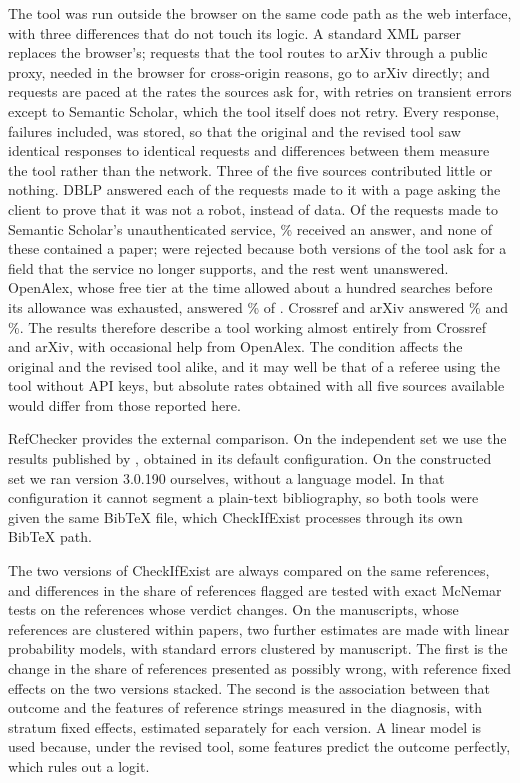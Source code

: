 \documentclass[pdflatex,sn-apa]{sn-jnl}
\begin{document}
The tool was run outside the browser on the same code path as the web interface, with three differences that do not touch its logic. A standard XML parser replaces the browser's; requests that the tool routes to arXiv through a public proxy, needed in the browser for cross-origin reasons, go to arXiv directly; and requests are paced at the rates the sources ask for, with retries on transient errors except to Semantic Scholar, which the tool itself does not retry. Every response, failures included, was stored, so that the original and the revised tool saw identical responses to identical requests and differences between them measure the tool rather than the network. Three of the five sources contributed little or nothing. DBLP answered each of the \DBLPRequests{} requests made to it with a page asking the client to prove that it was not a robot, instead of data. Of the \STwoRequests{} requests made to Semantic Scholar's unauthenticated service, \STwoAnswered{}\% received an answer, and none of these contained a paper; \STwoRejected{} were rejected because both versions of the tool ask for a field that the service no longer supports, and the rest went unanswered. OpenAlex, whose free tier at the time allowed about a hundred searches before its allowance was exhausted, answered \OAAnswered{}\% of \OARequests{}. Crossref and arXiv answered \CRAnswered{}\% and \AXAnswered{}\%. The results therefore describe a tool working almost entirely from Crossref and arXiv, with occasional help from OpenAlex. The condition affects the original and the revised tool alike, and it may well be that of a referee using the tool without API keys, but absolute rates obtained with all five sources available would differ from those reported here.

RefChecker \citep{russinovich2026} provides the external comparison. On the independent set we use the results published by \citet{badalova2026}, obtained in its default configuration. On the constructed set we ran version 3.0.190 ourselves, without a language model. In that configuration it cannot segment a plain-text bibliography, so both tools were given the same BibTeX file, which CheckIfExist processes through its own BibTeX path.

The two versions of CheckIfExist are always compared on the same references, and differences in the share of references flagged are tested with exact McNemar tests on the references whose verdict changes. On the manuscripts, whose references are clustered within papers, two further estimates are made with linear probability models, with standard errors clustered by manuscript. The first is the change in the share of references presented as possibly wrong, with reference fixed effects on the two versions stacked. The second is the association between that outcome and the features of reference strings measured in the diagnosis, with stratum fixed effects, estimated separately for each version. A linear model is used because, under the revised tool, some features predict the outcome perfectly, which rules out a logit.
\end{document}
